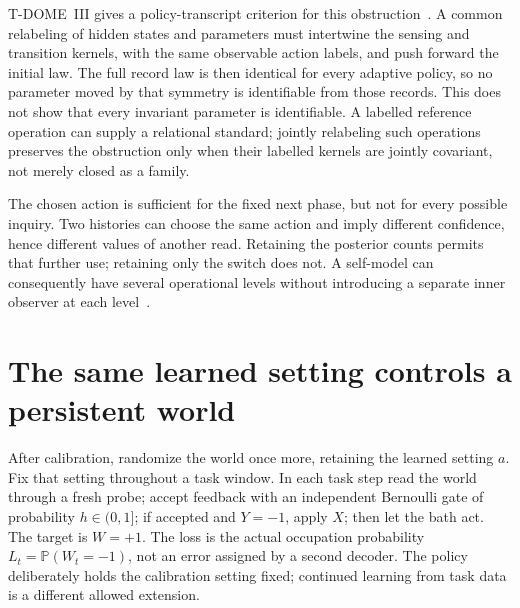 \documentclass[11pt,a4paper]{article}
\newcommand{\Prb}{\mathbb P}
\begin{document}
T-DOME~III gives a policy-transcript criterion for this obstruction~\cite{TDOMEIII}. A common relabeling of hidden states and parameters must intertwine the sensing and transition kernels, with the same observable action labels, and push forward the initial law. The full record law is then identical for every adaptive policy, so no parameter moved by that symmetry is identifiable from those records. This does not show that every invariant parameter is identifiable. A labelled reference operation can supply a relational standard; jointly relabeling such operations preserves the obstruction only when their labelled kernels are jointly covariant, not merely closed as a family.

The chosen action is sufficient for the fixed next phase, but not for every possible inquiry. Two histories can choose the same action and imply different confidence, hence different values of another read. Retaining the posterior counts permits that further use; retaining only the switch does not. A self-model can consequently have several operational levels without introducing a separate inner observer at each level~\cite{WorldImprint,StableHulls}.

\section{The same learned setting controls a persistent world}
\label{sec:return}

After calibration, randomize the world once more, retaining the learned setting $a$. Fix that setting throughout a task window. In each task step read the world through a fresh probe; accept feedback with an independent Bernoulli gate of probability $h\in(0,1]$; if accepted and $Y=-1$, apply $X$; then let the bath act. The target is $W=+1$. The loss is the actual occupation probability $L_t=\Prb(W_t=-1)$, not an error assigned by a second decoder. The policy deliberately holds the calibration setting fixed; continued learning from task data is a different allowed extension.
\end{document}
